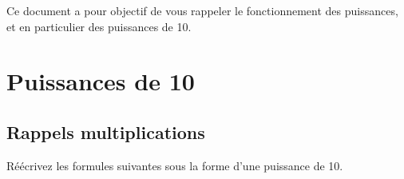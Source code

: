 \documentclass[11pt,a4paper]{article}
\begin{document}
\EncadreTitre

\bigskip


%
%

\bigskip


Ce document a pour objectif de vous rappeler le fonctionnement des puissances, et en particulier des puissances de 10.

%
%
%
%
%
%
%

\bigskip


\section{Puissances de 10}


\subsection{Rappels multiplications}

\medskip

Réécrivez les formules suivantes sous la forme d'une puissance de 10.

\bigskip
\end{document}
